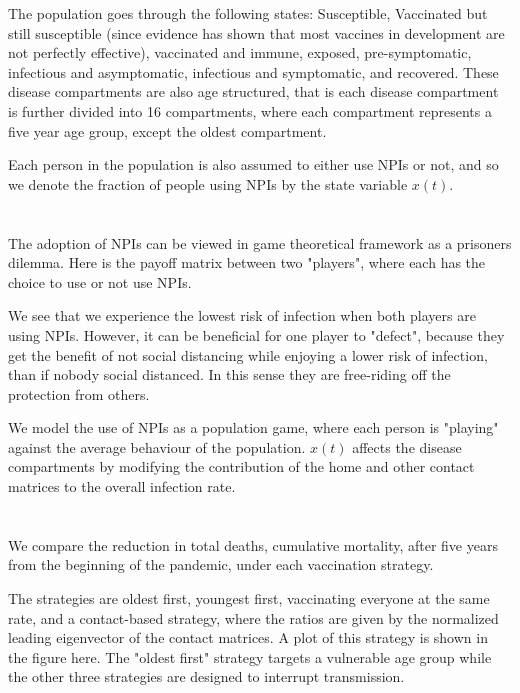\documentclass{article}
\begin{document}
The population goes through the following states: Susceptible, Vaccinated but still susceptible (since evidence has shown that most vaccines in development are not perfectly effective), vaccinated and immune, exposed, pre-symptomatic, infectious and asymptomatic, infectious and symptomatic, and recovered. These disease compartments are also age structured, that is each disease compartment is further divided into 16 compartments, where each compartment represents a five year age group, except the oldest compartment.

Each person in the population is also assumed to either use NPIs or not, and so we denote the fraction of people using NPIs by the state variable $x(t)$.



\section{}
The adoption of NPIs can be viewed in game theoretical framework as a prisoners dilemma. Here is the payoff matrix between two "players", where each has the choice to use or not use NPIs. 

We see that we experience the lowest risk of infection when both players are using NPIs. However, it can be beneficial for one player to "defect", because they get the benefit of not social distancing while enjoying a lower risk of infection, than if nobody social distanced. In this sense they are free-riding off the protection from others.

We model the use of NPIs as a population game, where each person is "playing" against the average behaviour of the population. $x(t)$ affects the disease compartments by modifying the contribution of the home and other contact matrices to the overall infection rate.

\section{}



We compare the reduction in total deaths, cumulative mortality, after five years from the beginning of the pandemic, under each vaccination strategy.

The strategies are oldest first, youngest first, vaccinating everyone at the same rate, and a contact-based strategy, where the ratios are given by the normalized leading eigenvector of the contact matrices. A plot of this strategy is shown in the figure here. The "oldest first" strategy targets a vulnerable age group while the other three strategies are designed to interrupt transmission.
\end{document}
